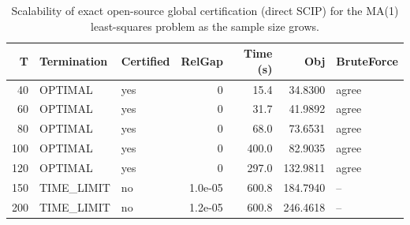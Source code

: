 \begin{table}[t]
\centering
\caption{Scalability of exact open-source global certification (direct SCIP) for the MA(1) least-squares problem as the sample size grows.}
\label{tab:solver_scaling}
\begin{tabular}{rllrrrl}
\hline
T & Termination & Certified & RelGap & Time (s) & Obj & BruteForce \\
\hline
40 & OPTIMAL & yes & 0 & 15.4 & 34.8300 & agree \\
60 & OPTIMAL & yes & 0 & 31.7 & 41.9892 & agree \\
80 & OPTIMAL & yes & 0 & 68.0 & 73.6531 & agree \\
100 & OPTIMAL & yes & 0 & 400.0 & 82.9035 & agree \\
120 & OPTIMAL & yes & 0 & 297.0 & 132.9811 & agree \\
150 & TIME\_LIMIT & no & 1.0e-05 & 600.8 & 184.7940 & -- \\
200 & TIME\_LIMIT & no & 1.2e-05 & 600.8 & 246.4618 & -- \\
\hline
\end{tabular}
\end{table}